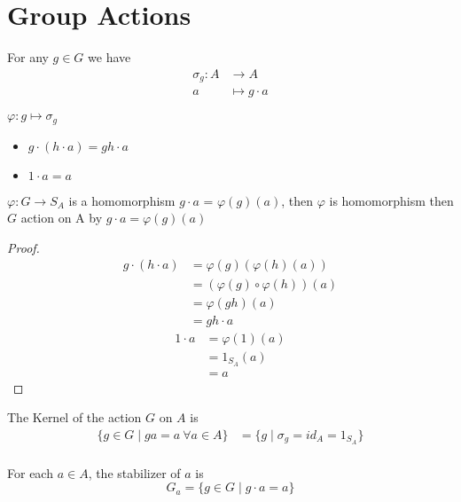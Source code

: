 \chapter{Group Actions}


For any $g \in G$ we have 
\begin{align*}
  \sigma_g: A &\to A \\
  a &\mapsto g\cdot a 
\end{align*}

$\varphi: g \mapsto \sigma_g$

\begin{itemize}
  \item $g \cdot (h \cdot a) = gh \cdot a$
  \item $1 \cdot a = a$
\end{itemize}
\begin{example}
  $\varphi: G \to S_A$ is a homomorphism
  $g\cdot a$ = $\varphi(g)(a)$, then 
  $\varphi$ is homomorphism then $G$ action on A by $g \cdot a = \varphi(g)(a)$ 
\end{example}

\begin{proof}
  \begin{align*}
    g\cdot(h\cdot a) &= \varphi(g)(\varphi(h)(a)) \\
    &=(\varphi(g)\circ\varphi(h))(a) \\
    &=\varphi(gh)(a) \\
    &=gh\cdot a
  \end{align*}
  \begin{align*}
    1\cdot a &= \varphi(1)(a) \\
    &= 1_{S_A}(a) \\
    &=a
  \end{align*}
\end{proof}

\begin{example}
  The Kernel of the action $G$ on $A$ is 
  \begin{align*}
    \{g \in G \mid ga = a\ \forall a \in A\} &= \{g \mid \sigma_g = id_A = 1_{S_A}\} \\
  \end{align*}
\end{example}

\begin{example}
  For each $a \in A$, the stabilizer of $a$ is
  \[G_a = \{g \in G \mid g \cdot a = a\}\]
\end{example}

